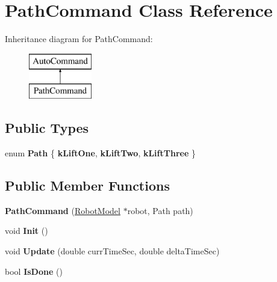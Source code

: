 \hypertarget{class_path_command}{}\section{Path\+Command Class Reference}
\label{class_path_command}
Inheritance diagram for Path\+Command\+:\begin{figure}[H]
\begin{center}
\leavevmode
\includegraphics[height=2.000000cm]{class_path_command}
\end{center}
\end{figure}
\subsection*{Public Types}
\begin{DoxyCompactItemize}
\item 
\mbox{\label{class_path_command_a16c9817753b2a9c1f171a6da90448424}} 
enum {\bfseries Path} \{ {\bfseries k\+Lift\+One}, 
{\bfseries k\+Lift\+Two}, 
{\bfseries k\+Lift\+Three}
 \}
\end{DoxyCompactItemize}
\subsection*{Public Member Functions}
\begin{DoxyCompactItemize}
\item 
\mbox{\label{class_path_command_af13590c26630833220671975f3d2ffa9}} 
{\bfseries Path\+Command} (\hyperlink{class_robot_model}{Robot\+Model} $\ast$robot, Path path)
\item 
\mbox{\label{class_path_command_af6b08e736ddda29d989fe484e9fd7383}} 
void {\bfseries Init} ()
\item 
\mbox{\label{class_path_command_a64f5ebbbe897a3305bdd9905e7b088f4}} 
void {\bfseries Update} (double curr\+Time\+Sec, double delta\+Time\+Sec)
\item 
\mbox{\label{class_path_command_a29e919cef5f6ba460060c6252d2c2910}} 
bool {\bfseries Is\+Done} ()
\end{DoxyCompactItemize}
